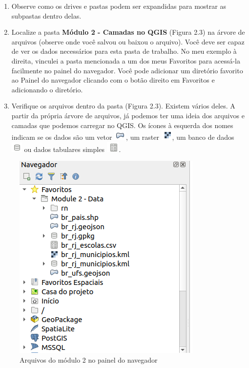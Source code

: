 \documentclass[
  portuguese,
]{krantz}
\providecommand{\tightlist}{%
  \setlength{\itemsep}{0pt}\setlength{\parskip}{0pt}}
\begin{document}
\begin{enumerate}
\def\labelenumi{\arabic{enumi}.}
\setcounter{enumi}{2}
\tightlist
\item
  Observe como os drives e pastas podem ser expandidas para mostrar as subpastas dentro delas.
\item
  Localize a pasta \textbf{Módulo 2 - Camadas no QGIS} (Figura 2.3) na árvore de arquivos (observe onde você salvou ou baixou o arquivo). Você deve ser capaz de ver os dados necessários para esta pasta de trabalho. No meu exemplo à direita, vinculei a pasta mencionada a um dos meus Favoritos para acessá-la facilmente no painel do navegador. Você pode adicionar um diretório favorito ao Painel do navegador clicando com o botão direito em Favoritos e adicionando o diretório.
\item
  Verifique os arquivos dentro da pasta (Figura 2.3). Existem vários deles. A partir da própria árvore de arquivos, já podemos ter uma ideia dos arquivos e camadas que podemos carregar no QGIS. Os ícones à esquerda dos nomes indicam se os dados são um vetor \includegraphics{media/modulo2/symbol-vector.png}, um raster \includegraphics{media/modulo2/symbol-raster.png}, um banco de dados \includegraphics{media/modulo2/symbol-db.png} ou dados tabulares simples \includegraphics{media/modulo2/symbol-table.png}.
\end{enumerate}

\begin{figure}
\centering
\includegraphics{media/modulo2/qgis-browser-2.png}
\caption{Arquivos do módulo 2 no painel do navegador}
\end{figure}
\end{document}
